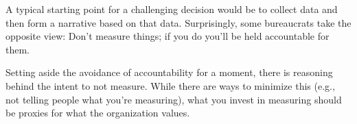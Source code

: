A typical starting point for a challenging decision would be to collect data and then form a narrative based on that data. Surprisingly, some bureaucrats take the opposite view: Don't measure things; if you do you'll be held accountable for them. 

Setting aside the avoidance of accountability for a moment, there is reasoning behind the intent to not measure.   While there are ways to minimize this (e.g., not telling people what you're measuring), what you invest in measuring should be proxies for what the organization values.